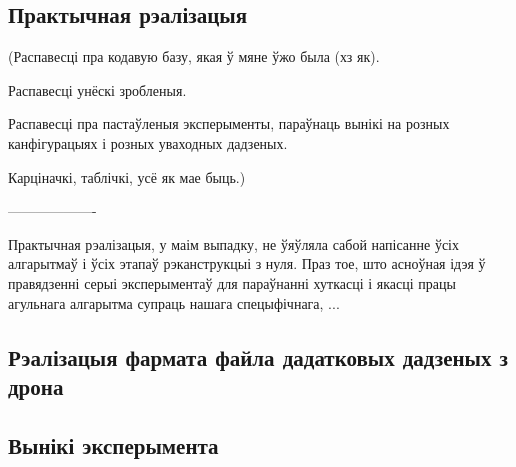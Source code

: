 \begin{center}
    \section*{Практычная рэалізацыя}    
\end{center}

(Распавесці пра кодавую базу, якая ў мяне ўжо была (хз як).

Распавесці унёскі зробленыя.

Распавесці пра пастаўленыя эксперыменты, параўнаць вынікі на розных канфігурацыях і розных уваходных дадзеных.

Карціначкі, таблічкі, усё як мае быць.)

-------------------

Практычная рэалізацыя, у маім выпадку, не ўяўляла сабой напісанне ўсіх алгарытмаў і ўсіх этапаў рэканструкцыі з нуля. Праз тое, што асноўная ідэя ў правядзенні серыі эксперыментаў для параўнанні хуткасці і якасці працы агульнага алгарытма супраць нашага спецыфічнага, ...

\subsection*{Рэалізацыя фармата файла дадатковых дадзеных з дрона}

\subsection*{Вынікі эксперымента}

\newpage